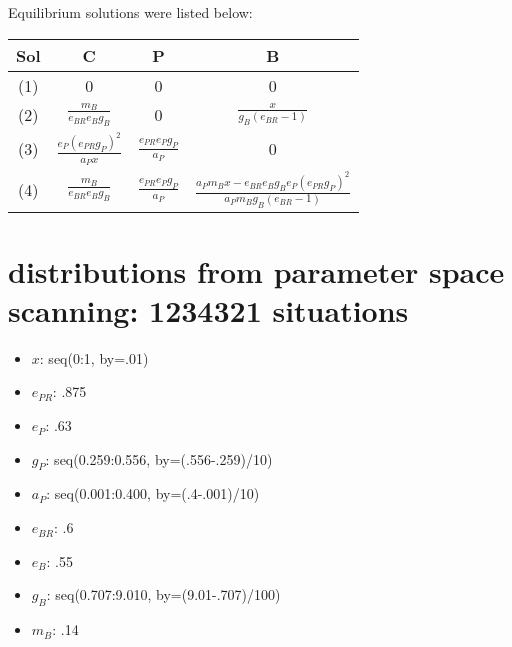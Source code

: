 \documentclass[a4paper,11pt]{article}
\begin{document}
    Equilibrium solutions were listed below:
    \begin{center}
        \begin{tabular}{c|ccc}\hline
            Sol & C & P & B\\\hline
            (1) & 0 & 0 & 0\\
            (2) & $\frac{m_B}{e_{BR}e_B g_B}$ & 0 & $\frac{x}{g_B(e_{BR} - 1)}$\\
            (3) & $\frac{e_P(e_{PR}g_P)^2}{a_P x}$ & $\frac{e_{PR}e_Pg_P}{a_P}$ & 0\\
            (4) & $\frac{m_B}{e_{BR}e_B g_B}$ & $\frac{e_{PR}e_P g_P}{a_P}$ & $\frac{a_P m_B x - e_{BR}e_B g_B e_P(e_{PR}g_P)^2}{a_P m_B g_B(e_{BR}-1)}$\\\hline
        \end{tabular}
    \end{center}
    
    \section{distributions from parameter space scanning: 1234321 situations}
    \begin{itemize}
        \item $x$: seq(0:1, by=.01)
        \item $e_{PR}$: .875
        \item $e_P$: .63
        \item $g_P$: seq(0.259:0.556, by=(.556-.259)/10)
        \item $a_P$: seq(0.001:0.400, by=(.4-.001)/10)
        \item $e_{BR}$: .6
        \item $e_B$: .55
        \item $g_B$: seq(0.707:9.010, by=(9.01-.707)/100)
        \item $m_B$: .14
    \end{itemize}
\end{document}
